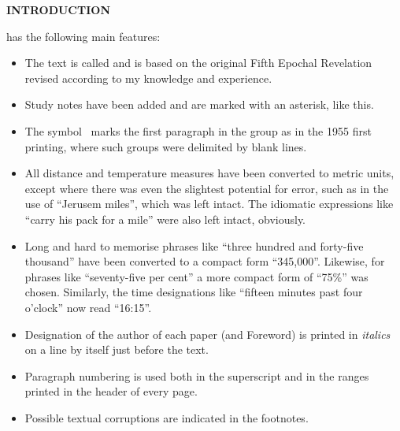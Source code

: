 \newpage
\thispagestyle{empty}

\makeatletter
{}%
\makeatother

\begin{center}
\Large{}\bfseries
INTRODUCTION
\end{center}


 has the following main features:

\begin{itemize}
\item The text is called  and is based on the original Fifth Epochal Revelation revised according to my knowledge and experience.
\item Study notes have been added and are marked with an asterisk, like this\ts{*}.
\item The symbol \pc\ marks the first paragraph in the group as in the 1955 first printing, where such groups were delimited by blank lines.
\item All distance and temperature measures have been converted to metric units, except where there was even the slightest potential for error, such as in the use of ``Jerusem miles'', which was left intact. The idiomatic expressions like ``carry his pack for a mile'' were also left intact, obviously.
\item Long and hard to memorise phrases like ``three hundred and forty\hyp{}five thousand'' have been converted to a compact form ``345,000''. Likewise, for phrases like ``seventy\hyp{}five per cent'' a more compact form of ``75\%'' was chosen. Similarly, the time designations like ``fifteen minutes past four o’clock'' now read ``16:15''.
\item Designation of the author of each paper (and Foreword) is printed in \textit{italics} on a line by itself just before the text.
\item Paragraph numbering is used both in the superscript and in the ranges printed in the head\-er of every page.
\item Possible textual corruptions are indicated in the footnotes.
\end{itemize}

